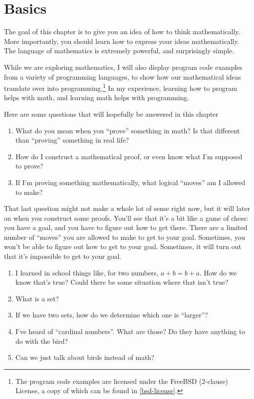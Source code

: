 \chapter{Basics}
\label{basics}

The goal of this chapter is to give you an idea of how to think
mathematically. More importantly, you should learn how to express your
ideas mathematically. The language of mathematics is extremely
powerful, and surprisingly simple.

While we are exploring mathematics, I will also display program code
examples from a variety of programming languages, to show how our
mathematical ideas translate over into programming.\footnote{The
  program code examples are licensed under the FreeBSD (2-clause)
  License, a copy of which can be found in \cref{bsd-license}.} In my
experience, learning how to program helps with math, and learning math
helps with programming.

Here are some questions that will hopefully be answered in this
chapter

\begin{enumerate}
\item What do you mean when you ``prove'' something in math? Is that
  different than ``proving'' something in real life?
\item How do I construct a mathematical proof, or even know what I'm
  supposed to prove?
\item If I'm proving something mathematically, what logical ``moves''
  am I allowed to make?
\end{enumerate}

That last question might not make a whole lot of sense right now, but
it will later on when you construct some proofs. You'll see that it's
a bit like a game of chess: you have a goal, and you have to figure
out how to get there. There are a limited number of ``moves'' you are
allowed to make to get to your goal. Sometimes, you won't be able to
figure out how to get to your goal. Sometimes, it will turn out that
it's impossible to get to your goal.

\begin{enumerate}[start=4]
\item I learned in school things like, for two numbers,
  $a + b = b + a$. How do we know that's true? Could there be some
  situation where that isn't true?
\item What is a set?
\item If we have two sets, how do we determine which one is
  ``larger''?
\item I've heard of ``cardinal numbers''. What are those? Do they have
  anything to do with the bird?
\item Can we just talk about birds instead of math?
\end{enumerate}

